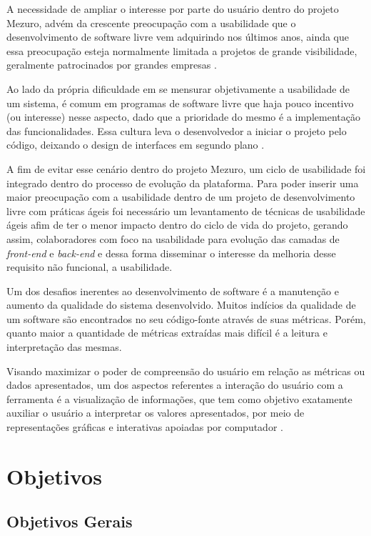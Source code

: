 A necessidade de ampliar o interesse por parte do usuário dentro do projeto Mezuro, advém da crescente preocupação com a usabilidade que o desenvolvimento de software livre vem adquirindo nos últimos anos, ainda que essa preocupação esteja normalmente limitada a projetos de grande visibilidade, geralmente patrocinados por grandes empresas \cite{nichols2006}.

Ao lado da própria dificuldade em se mensurar objetivamente a usabilidade de um sistema, é comum em programas de software livre que haja pouco incentivo (ou interesse) nesse aspecto, dado que a prioridade do mesmo é a implementação das funcionalidades. Essa cultura leva o desenvolvedor a iniciar o projeto pelo código, deixando o design de interfaces em segundo plano  \cite{thomas2008}.

A fim de evitar esse cenário dentro do projeto Mezuro, um ciclo de usabilidade foi integrado dentro do processo de evolução da plataforma. Para poder inserir uma maior preocupação com a usabilidade dentro de um projeto de desenvolvimento livre com práticas ágeis foi necessário um levantamento de técnicas de usabilidade ágeis afim de ter o menor impacto dentro do ciclo de vida do projeto, gerando assim, colaboradores com foco na usabilidade para evolução das camadas de \textit{front-end} e \textit{back-end} e dessa forma disseminar o interesse da melhoria desse requisito não funcional, a usabilidade.

Um dos desafios inerentes ao desenvolvimento de software é a manutenção e aumento da qualidade do sistema desenvolvido. Muitos indícios da qualidade de um software são encontrados no seu código-fonte através de suas métricas. Porém, quanto maior a quantidade de métricas extraídas mais difícil é a leitura e interpretação das mesmas.

Visando maximizar o poder de compreensão do usuário em relação as métricas ou dados apresentados, um dos aspectos referentes a interação do usuário com a ferramenta é a visualização de informações, que tem como objetivo exatamente auxiliar o usuário a interpretar os valores apresentados, por meio de representações gráficas e interativas apoiadas por computador \cite{rafaelmessiasmartins2012}.

\section{Objetivos}

\subsection{Objetivos Gerais}

